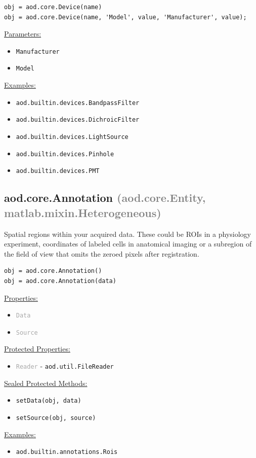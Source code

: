 \documentclass[10pt]{exam}
\newcommand\myparent[1]{\textcolor{gray}{(#1)}}
\newcommand\aodparam[1]{\textcolor{codepurple}{\texttt{#1}}}
\newcommand\aodclass[1]{\textcolor{codeblue}{\texttt{#1}}}
\newcommand\aodprop[1]{\textcolor{darkgray}{\texttt{#1}}}
\newcommand\aodfcn[1]{\textcolor{darkteal}{\texttt{#1}}}
\newcommand\docheader[1]{\vspace{0.6ex}\noindent\underline{#1}\vspace{0.15ex}}
\begin{document}
		\begin{lstlisting}[style=matlab-editor, basicstyle=\mlttfamily\footnotesize]
obj = aod.core.Device(name)
obj = aod.core.Device(name, 'Model', value, 'Manufacturer', value);
		\end{lstlisting}
		\docheader{Parameters:}
		\begin{itemize}
			\item \aodparam{Manufacturer}
			\item \aodparam{Model}
		\end{itemize}
		\docheader{Examples:}
		\begin{itemize}
			\item \aodclass{aod.builtin.devices.BandpassFilter}
			\item \aodclass{aod.builtin.devices.DichroicFilter}
			\item \aodclass{aod.builtin.devices.LightSource}
			\item \aodclass{aod.builtin.devices.Pinhole}
			\item \aodclass{aod.builtin.devices.PMT}
		\end{itemize}
	
	\subsection{aod.core.Annotation \myparent{aod.core.Entity, matlab.mixin.Heterogeneous}} 
		\noindent Spatial regions within your acquired data. These could be ROIs in a physiology experiment, coordinates of labeled cells in anatomical imaging or a subregion of the field of view that omits the zeroed pixels after registration.  
	
		\begin{lstlisting}[style=matlab-editor, basicstyle=\mlttfamily\footnotesize]
obj = aod.core.Annotation()		
obj = aod.core.Annotation(data)
		\end{lstlisting}
		\docheader{Properties:}
		\begin{itemize}
			\item \aodprop{Data}
			\item \aodprop{Source}
		\end{itemize}
		\docheader{Protected Properties:}
		\begin{itemize}
			\item \aodprop{Reader} - \aodclass{aod.util.FileReader}
		\end{itemize}
		\docheader{Sealed Protected Methods:}
		\begin{itemize}
			\item \aodfcn{setData(obj, data)}
			\item \aodfcn{setSource(obj, source)}
		\end{itemize}
		\docheader{Examples:}
		\begin{itemize}
			\item \aodclass{aod.builtin.annotations.Rois}
		\end{itemize}
\end{document}
